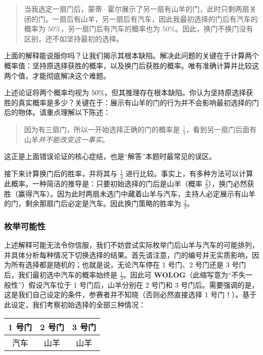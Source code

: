 \begin{quote}
    当我选定一扇门后，蒙蒂·霍尔展示了另一扇有山羊的门，此时只剩两扇关闭的门。一扇后有山羊，另一扇后有汽车，因此我最初选择的门后有汽车的概率为 $50\%$，另一扇门后有汽车的概率也为 $50\%$。因此，换门不换门没有区别，还不如坚持最初的选择。
\end{quote}

上面的解释能说服你吗？让我们揭示其根本缺陷。解决此问题的关键在于计算两个概率值：坚持原选择获胜的概率，以及换门后获胜的概率。唯有准确计算并比较这两个值，才能彻底解决这个难题。

上述论证将两个概率均视为 $50\%$，但其推理存在根本缺陷。你认为坚持原选择获胜的真实概率是多少？关键在于：展示有山羊的门的行为并不会影响最初选择的门后的物体。请重点理解以下陈述：

\begin{quote}
    因为有三扇门，所以一开始选择正确的门的概率是 $\frac{1}{3}$，看到另一扇门后面有山羊\emph{并不能改变这一事实}。
\end{quote}
这正是上面错误论证的核心症结，也是``解答''本题时最常见的误区。

接下来计算换门后的胜率，并将其与 $\frac{1}{3}$ 进行比较。事实上，有多种方法可以计算此概率。一种简洁的推导是：只要初始选择的门后是山羊（概率 $\frac{2}{3}$），换门必然获胜（赢得汽车）。因为此时两扇未选门中藏着山羊与汽车，主持人必定展示有山羊的门，剩余那扇门后必定是汽车。因此换门策略的胜率为 $\frac{2}{3}$。

\subsubsection*{枚举可能性}

上述解释可能无法令你信服，我们不妨尝试实际枚举门后山羊与汽车的可能排列，并具体分析每种情况下切换选择的结果。首先请注意，门的编号并无实质影响，因为所有选择都是随机的；也就是说，无论汽车停在 1 号门、2 号门还是 3 号门后，我们最初选中汽车的概率始终是 $\frac{1}{3}$。因此可 \textbf{WOLOG}（此缩写意为``不失一般性''）假设汽车位于 1 号门后，山羊分别在 2 号门和 3 号门后。需要强调的是，这是我们自己设定的条件，参赛者并不知晓（否则必然直接选择 1 号门！）。基于此设定，我们考察初始选择的全部三种情况：

\begin{center}
    \begin{tabular}{ c|c|c } 
     1 号门 & 2 号门  & 3 号门 \\ 
     \hline 
     汽车   & 山羊    & 山羊 \\
    \end{tabular}
\end{center}

